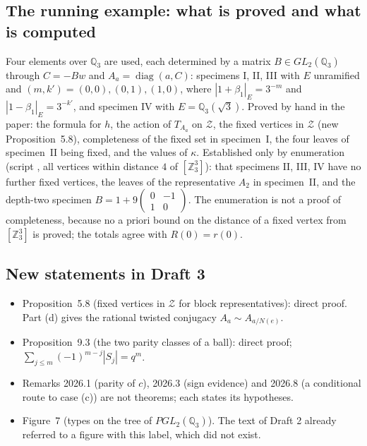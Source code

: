 \documentclass[12pt,letterpaper]{amsart}
\begin{document}
\subsection*{The running example: what is proved and what is computed}
Four elements over $\mathbb Q_3$ are used, each determined by a matrix
$B\in GL_2(\mathbb Q_3)$ through $C=-Bw$ and
$A_a=\operatorname{diag}(a,C)$: specimens I, II, III with $E$
unramified and $(m,k')=(0,0),(0,1),(1,0)$, where
$|1+\beta_1|_E=3^{-m}$ and $|1-\beta_1|_E=3^{-k'}$, and specimen IV
with $E=\mathbb Q_3(\sqrt3)$. Proved by hand in the paper: the formula
for $h$, the action of $T_{A_a}$ on $\mathcal Z$, the fixed vertices
in $\mathcal Z$ (new Proposition~5.8), completeness of the fixed set
in specimen~I, the four leaves of specimen~II being fixed, and the
values of $\kappa$. Established only by enumeration (script
, all vertices within
distance $4$ of $[\mathbb Z_3^3]$): that specimens II, III, IV have no
further fixed vertices, the leaves of the representative $A_2$ in
specimen~II, and the depth-two specimen
$B=1+9\left(\begin{smallmatrix}0&-1\\1&0\end{smallmatrix}\right)$.
The enumeration is not a proof of completeness, because no a priori
bound on the distance of a fixed vertex from $[\mathbb Z_3^3]$ is
proved; the totals agree with $R(0)=r(0)$.

\subsection*{New statements in Draft 3}
\begin{itemize}
\item Proposition~5.8 (fixed vertices in $\mathcal Z$ for block
representatives): direct proof. Part (d) gives the rational twisted
conjugacy $A_a\sim A_{a/N(e)}$.
\item Proposition~9.3 (the two parity classes of a ball): direct
proof; $\sum_{j\le m}(-1)^{m-j}|S_j|=q^m$.
\item Remarks 2026.1 (parity of $c$), 2026.3 (sign evidence) and
2026.8 (a conditional route to case (c)) are not theorems; each states
its hypotheses.
\item Figure~7 (types on the tree of $PGL_2(\mathbb Q_3)$). The text
of Draft 2 already referred to a figure with this label, which did not
exist.
\end{itemize}
\end{document}
